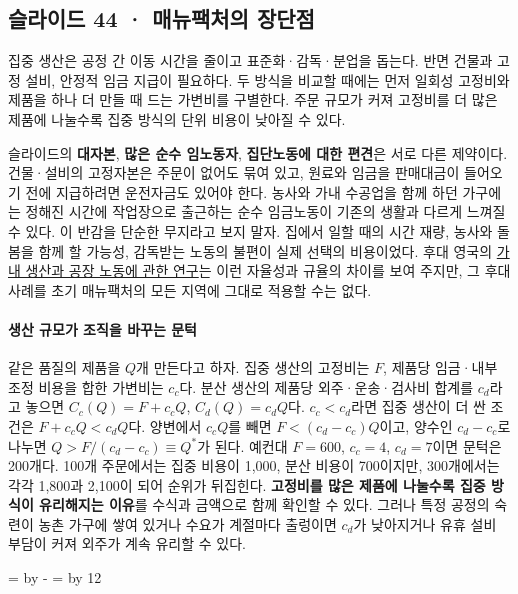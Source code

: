 \documentclass[10pt,a4paper]{article}
\newcommand{\ReserveQuestionSpace}{%
  \par\begingroup
  \dimen0=\pagegoal \advance\dimen0 by -\pagetotal
  \dimen2=\baselineskip \multiply\dimen2 by 12
  \ifdim\dimen0<\dimen2 \newpage\fi
  \endgroup}
\begin{document}
\subsection{슬라이드 44 · 매뉴팩처의 장단점}
집중 생산은 공정 간 이동 시간을 줄이고 표준화·감독·분업을 돕는다. 반면 건물과 고정 설비, 안정적 임금 지급이 필요하다. 두 방식을 비교할 때에는 먼저 일회성 고정비와 제품을 하나 더 만들 때 드는 가변비를 구별한다. 주문 규모가 커져 고정비를 더 많은 제품에 나눌수록 집중 방식의 단위 비용이 낮아질 수 있다.\par

슬라이드의 \textbf{대자본}, \textbf{많은 순수 임노동자}, \textbf{집단노동에 대한 편견}은 서로 다른 제약이다. 건물·설비의 고정자본은 주문이 없어도 묶여 있고, 원료와 임금을 판매대금이 들어오기 전에 지급하려면 운전자금도 있어야 한다. 농사와 가내 수공업을 함께 하던 가구에는 정해진 시간에 작업장으로 출근하는 순수 임금노동이 기존의 생활과 다르게 느껴질 수 있다. 이 반감을 단순한 무지라고 보지 말자. 집에서 일할 때의 시간 재량, 농사와 돌봄을 함께 할 가능성, 감독받는 노동의 불편이 실제 선택의 비용이었다. 후대 영국의 \href{https://www.econ.ucdavis.edu/faculty/gclark/ecn110b/readings/chapter9-2004.pdf}{가내 생산과 공장 노동에 관한 연구}는 이런 자율성과 규율의 차이를 보여 주지만, 그 후대 사례를 초기 매뉴팩처의 모든 지역에 그대로 적용할 수는 없다.\par

\paragraph{생산 규모가 조직을 바꾸는 문턱}

같은 품질의 제품을 $Q$개 만든다고 하자. 집중 생산의 고정비는 $F$, 제품당 임금·내부 조정 비용을 합한 가변비는 $c_c$다. 분산 생산의 제품당 외주·운송·검사비 합계를 $c_d$라고 놓으면 $C_c(Q)=F+c_cQ$, $C_d(Q)=c_dQ$다. $c_c<c_d$라면 집중 생산이 더 싼 조건은 $F+c_cQ<c_dQ$다. 양변에서 $c_cQ$를 빼면 $F<(c_d-c_c)Q$이고, 양수인 $c_d-c_c$로 나누면 $Q>F/(c_d-c_c)\equiv Q^*$가 된다. 예컨대 $F=600$, $c_c=4$, $c_d=7$이면 문턱은 200개다. 100개 주문에서는 집중 비용이 1,000, 분산 비용이 700이지만, 300개에서는 각각 1,800과 2,100이 되어 순위가 뒤집힌다. \textbf{고정비를 많은 제품에 나눌수록 집중 방식이 유리해지는 이유}를 수식과 금액으로 함께 확인할 수 있다. 그러나 특정 공정의 숙련이 농촌 가구에 쌓여 있거나 수요가 계절마다 출렁이면 $c_d$가 낮아지거나 유휴 설비 부담이 커져 외주가 계속 유리할 수 있다.\par

\ReserveQuestionSpace
\end{document}
